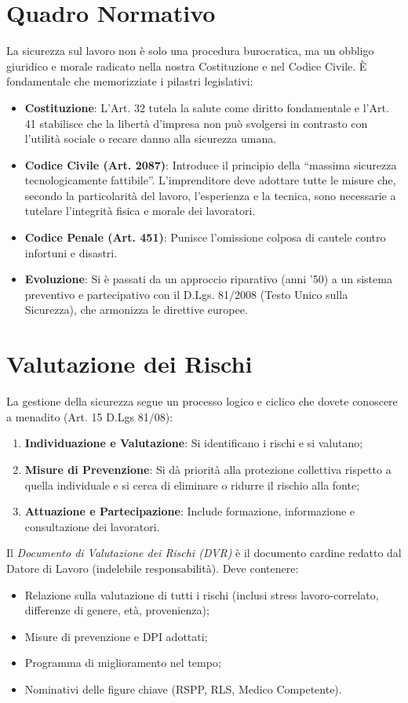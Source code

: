 %
%
\section{Quadro Normativo}
La sicurezza sul lavoro non è solo una procedura burocratica, ma un obbligo giuridico e morale radicato nella nostra Costituzione e nel Codice Civile. È fondamentale che memorizziate i pilastri legislativi:
\begin{itemize}
    \item \textbf{Costituzione}: L'Art. 32 tutela la salute come diritto fondamentale e l'Art. 41 stabilisce che la libertà d'impresa non può svolgersi in contrasto con l'utilità sociale o recare danno alla sicurezza umana.
    \item \textbf{Codice Civile (Art. 2087)}: Introduce il principio della ``massima sicurezza tecnologicamente fattibile''. L'imprenditore deve adottare tutte le misure che, secondo la particolarità del lavoro, l'esperienza e la tecnica, sono necessarie a tutelare l'integrità fisica e morale dei lavoratori.
    \item \textbf{Codice Penale (Art. 451)}: Punisce l'omissione colposa di cautele contro infortuni e disastri.
    \item \textbf{Evoluzione}: Si è passati da un approccio riparativo (anni '50) a un sistema preventivo e partecipativo con il D.Lgs. 81/2008 (Testo Unico sulla Sicurezza), che armonizza le direttive europee.
\end{itemize}

%
\section{Valutazione dei Rischi}
La gestione della sicurezza segue un processo logico e ciclico che dovete conoscere a menadito (Art. 15 D.Lgs 81/08):
\begin{enumerate}
    \item \textbf{Individuazione e Valutazione}: Si identificano i rischi e si valutano;
    \item \textbf{Misure di Prevenzione}: Si dà priorità alla protezione collettiva rispetto a quella individuale e si cerca di eliminare o ridurre il rischio alla fonte;
    \item \textbf{Attuazione e Partecipazione}: Include formazione, informazione e consultazione dei lavoratori.
\end{enumerate}

Il \emph{Documento di Valutazione dei Rischi (DVR)} è il documento cardine redatto dal Datore di Lavoro (indelebile responsabilità). Deve contenere:
\begin{itemize}
    \item Relazione sulla valutazione di tutti i rischi (inclusi stress lavoro-correlato, differenze di genere, età, provenienza);
    \item Misure di prevenzione e DPI adottati;
    \item Programma di miglioramento nel tempo;
    \item Nominativi delle figure chiave (RSPP, RLS, Medico Competente).
\end{itemize}

